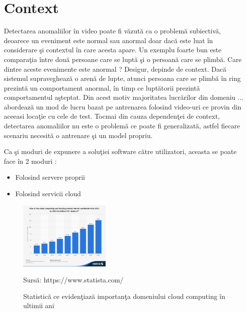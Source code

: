 \documentclass[a4paper,12pt]{report}
\newcommand{\source}[1]{\caption*{Sursă: {#1}} }
\begin{document}
\section{Context}
\quad Detectarea anomaliilor în video poate fi văzută ca o problemă subiectivă, deoarece un eveniment este normal sau anormal doar dacă este luat în considerare şi contextul în care acesta apare. Un exemplu foarte bun este comparaţia între două persoane care se luptă şi o persoană care se plimbă. Care dintre aceste evenimente este anormal ? Desigur, depinde de context. Dacă sistemul supraveghează o arenă de lupte, atunci persoana care se plimbă în ring prezintă un comportament anormal, în timp ce luptătorii prezintă comportamentul aşteptat. Din acest motiv majoritatea lucrărilor din domeniu \cite{cheng2015,ionescu2019object,sultani2018}...  abordează un mod de lucru bazat pe antrenarea folosind video-uri ce provin din aceeasi locaţie cu cele de test. Tocmai din cauza dependenţei de context, detectarea anomaliilor nu este o problemă ce poate fi generalizată, astfel fiecare scenariu necesită o antrenare şi un model propriu. \par

Ca şi moduri de expunere a soluţiei software către utilizatori, aceasta se poate face în 2 moduri :
\begin{itemize}
\item Folosind servere proprii
\item Folosind servicii cloud
\end{itemize}
\par

\begin{figure}
	  \begin{center}
        \includegraphics[width=0.4\textwidth]{images/grafic_cloud_computing}
			\label{fig:cloud_computing_graph}
       \caption{Statistică ce evidenţiază importanţa domeniului cloud computing în ultimii ani}
       \source {https://www.statista.com/}
    \end{center}
\end{figure}
\end{document}
